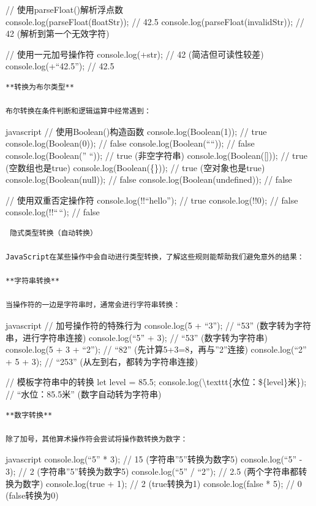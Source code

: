 // 使用parseFloat()解析浮点数\\
console.log(parseFloat(floatStr)); // 42.5 console.log(parseFloat(invalidStr)); // 42 (解析到第一个无效字符)

// 使用一元加号操作符 console.log(+str); // 42 (简洁但可读性较差) console.log(+``42.5''); // 42.5

\begin{lstlisting}
**转换为布尔类型**

布尔转换在条件判断和逻辑运算中经常遇到：
\end{lstlisting}

javascript // 使用Boolean()构造函数 console.log(Boolean(1)); // true console.log(Boolean(0)); // false console.log(Boolean(````)); // false console.log(Boolean('' ``)); // true (非空字符串) console.log(Boolean({[}{]})); // true (空数组也是true) console.log(Boolean(\{\})); // true (空对象也是true) console.log(Boolean(null)); // false console.log(Boolean(undefined)); // false

// 使用双重否定操作符 console.log(!!``hello''); // true console.log(!!0); // false console.log(!!{}``\,``); // false

\begin{lstlisting}
 隐式类型转换（自动转换）

JavaScript在某些操作中会自动进行类型转换，了解这些规则能帮助我们避免意外的结果：

**字符串转换**

当操作符的一边是字符串时，通常会进行字符串转换：
\end{lstlisting}

javascript // 加号操作符的特殊行为 console.log(5 + ``3''); // ``53'' (数字转为字符串，进行字符串连接) console.log(``5'' + 3); // ``53'' (数字转为字符串) console.log(5 + 3 + ``2''); // ``82'' (先计算5+3=8，再与''2''连接) console.log(``2'' + 5 + 3); // ``253'' (从左到右，都转为字符串连接)

// 模板字符串中的转换 let level = 85.5; console.log(\textbackslash texttt\{水位：\$\{level\}米\}); // ``水位：85.5米'' (数字自动转为字符串)

\begin{lstlisting}
**数字转换**  

除了加号，其他算术操作符会尝试将操作数转换为数字：
\end{lstlisting}

javascript console.log(``5'' * 3); // 15 (字符串''5''转换为数字5) console.log(``5'' - 3); // 2 (字符串''5''转换为数字5) console.log(``5'' / ``2''); // 2.5 (两个字符串都转换为数字) console.log(true + 1); // 2 (true转换为1) console.log(false * 5); // 0 (false转换为0)


